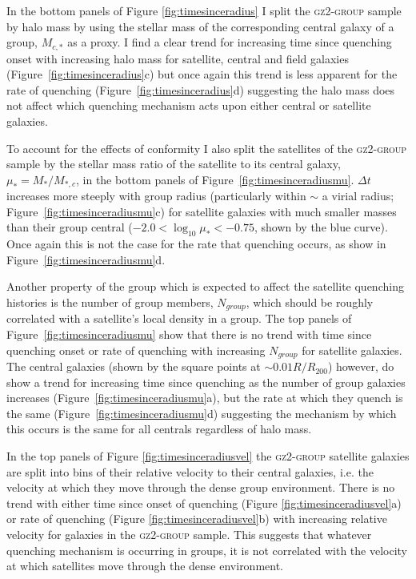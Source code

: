 In the bottom panels of Figure \ref{fig:timesinceradius} I split the \textsc{gz2-group} sample by halo mass by using the stellar mass of the corresponding central galaxy of a group, $M_{c,*}$ as a proxy. I find a clear trend for increasing time since quenching onset with increasing halo mass for satellite, central and field galaxies (Figure~\ref{fig:timesinceradius}c) but once again this trend is less apparent for the rate of quenching (Figure~\ref{fig:timesinceradius}d) suggesting the halo mass does not affect which quenching mechanism acts upon either central or satellite galaxies. 

To account for the effects of conformity \citep[i.e. that satellites of higher mass tend to be found in higher mass halos]{weinmann06, kauffmann13, hearin15, hatfield16} I also split the satellites of the \textsc{gz2-group} sample by the stellar mass ratio of the satellite to its central galaxy, $\mu_* = M_*/M_{*,c}$, in the bottom panels of Figure~\ref{fig:timesinceradiusmu}. $\Delta t $ increases more steeply with group radius (particularly within $\sim$ a virial radius; Figure~\ref{fig:timesinceradiusmu}c) for satellite galaxies with much smaller masses than their group central ($-2.0 < \log_{10}\mu_* < -0.75$, shown by the blue curve). Once again this is not the case for the rate that quenching occurs, as show in Figure~\ref{fig:timesinceradiusmu}d. 

Another property of the group which is expected to affect the satellite quenching histories is the number of group members, $N_{group}$, which should be roughly correlated with a satellite's local density in a  group. The top panels of Figure~\ref{fig:timesinceradiusmu} show that there is no trend with time since quenching onset or rate of quenching with increasing $N_{group}$ for satellite galaxies. The central galaxies (shown by the square points at $\sim 0.01 R/R_{200}$) however, do show a trend for increasing time since quenching as the number of group galaxies increases (Figure~\ref{fig:timesinceradiusmu}a), but the rate at which they quench is the same (Figure~\ref{fig:timesinceradiusmu}d) suggesting the mechanism by which this occurs is the same for all centrals regardless of halo mass. 

In the top panels of Figure \ref{fig:timesinceradiusvel} the \textsc{gz2-group} satellite galaxies are split into bins of their relative velocity to their central galaxies, i.e. the velocity at which they move through the dense group environment. There is no trend with either time since onset of quenching (Figure \ref{fig:timesinceradiusvel}a) or rate of quenching (Figure \ref{fig:timesinceradiusvel}b) with increasing relative velocity for galaxies in the \textsc{gz2-group} sample. This suggests that whatever quenching mechanism is occurring in groups, it is not correlated with the velocity at which satellites move through the dense environment.

